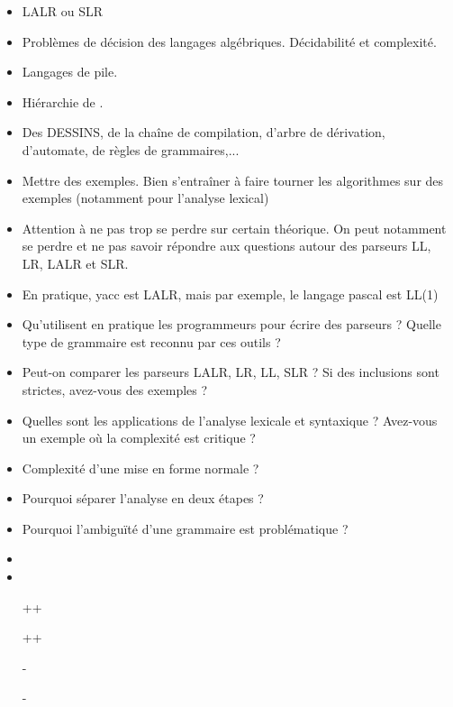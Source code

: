 \documentclass{agregfiche}
\begin{document}
\secidees

\begin{itemize}
	\item LALR ou SLR
    \item Problèmes de décision des langages algébriques. Décidabilité et complexité.
    \item Langages de pile.
    \item Hiérarchie de .
\end{itemize}

\secpieges

\begin{itemize}
    \item Des DESSINS, de la chaîne de compilation, d'arbre de dérivation, d'automate, de règles de grammaires,...
    \item Mettre des exemples. Bien s'entraîner à faire tourner les algorithmes sur des exemples (notamment pour l'analyse lexical)
	\item Attention à ne pas trop se perdre sur certain théorique. On peut notamment se perdre et ne pas savoir répondre aux questions autour des parseurs LL, LR, LALR et SLR. 
    \item En pratique, yacc est LALR, mais par exemple, le langage pascal est LL(1)

\end{itemize}

\secquestionsclassiques

\begin{itemize}
	\item Qu'utilisent en pratique les programmeurs pour écrire des parseurs ? Quelle type de grammaire est reconnu par ces outils ?
\item Peut-on comparer les parseurs LALR, LR, LL, SLR ? Si  des inclusions sont strictes, avez-vous des exemples ?
\item Quelles sont les applications de l'analyse lexicale et 
syntaxique ? Avez-vous un exemple où la complexité est critique ?
\item Complexité d'une mise en forme normale ?
\item Pourquoi séparer l'analyse en deux étapes ?
\item Pourquoi l'ambiguïté d'une grammaire est problématique ?

\end{itemize}

\secreferences

\begin{itemize}
\item 
\item 
\end{itemize}

\secdev

\begin{itemize}
\item[++] 
\item[++] 
\item[-] 
\item[-] 
\end{itemize}
\end{document}

